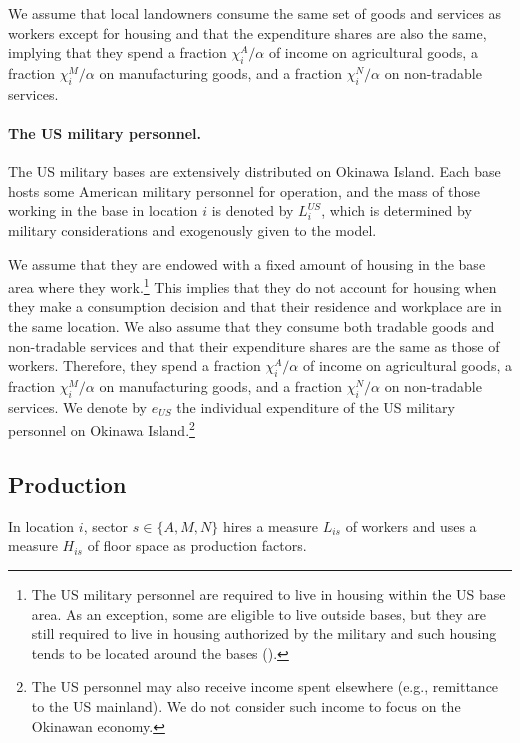 \documentclass[12pt, unicode, a4paper]{article}
\newcommand{\1}{\mbox{1}\hspace{-0.25em}\mbox{l}} %
\begin{document}
We assume that local landowners consume the same set of goods and services as workers except for housing and that the expenditure shares are also the same, implying that they spend a fraction $\chi_{i}^A/\alpha$ of income on agricultural goods, a fraction $\chi_{i}^M/\alpha$ on manufacturing goods, and a fraction $\chi_{i}^N/\alpha$ on non-tradable services.

\paragraph{The US military personnel.}
The US military bases are extensively distributed on Okinawa Island. Each base hosts some American military personnel for operation, and the mass of those working in the base in location $i$ is denoted by $L_i^{US}$, which is determined by military considerations and exogenously given to the model.

We assume that they are endowed with a fixed amount of housing in the base area where they work.\footnote{The US military personnel are required to live in housing within the US base area. As an exception, some are eligible to live outside bases, but they are still required to live in housing authorized by the military and such housing tends to be located around the bases (\citealt{tomochi09}).
} 
This implies that they do not account for housing when they make a consumption decision and that their residence and workplace are in the same location. We also assume that they consume both tradable goods and non-tradable services and that their expenditure shares are the same as those of workers. Therefore, they spend a fraction $\chi_{i}^A/\alpha$ of income on agricultural goods, a fraction $\chi_{i}^M/\alpha$ on manufacturing goods, and a fraction $\chi_{i}^N/\alpha$ on non-tradable services.
We denote by $e_{US}$ the individual expenditure of the US military personnel on Okinawa Island.\footnote{The US personnel may also receive income spent elsewhere (e.g., remittance to the US mainland). We do not consider such income to focus on the Okinawan economy.}


\subsection{Production}

In location $i$, sector $s \in \{ A,M,N \}$ hires a measure $L_{is}$ of workers and uses a measure $H_{is}$ of floor space as production factors. 
\end{document}
